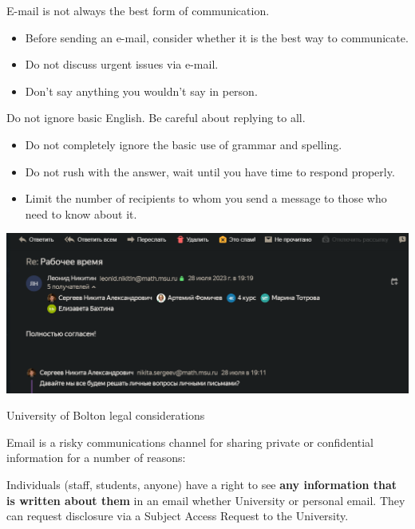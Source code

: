 \documentclass{beamer}
\begin{document}
\begin{frame}{E-mail is not always the best form of communication.}
  \begin{itemize}
    \item Before sending an e-mail, consider whether it is the best way to communicate.
    \item Do not discuss urgent issues via e-mail.
    \item Don't say anything you wouldn't say in person.
  \end{itemize}
\end{frame}

\begin{frame}{Do not ignore basic English. Be careful about replying to all.}
  \begin{itemize}
    \item Do not completely ignore the basic use of grammar and spelling.
    \item Do not rush with the answer, wait until you have time to respond properly.
    \item Limit the number of recipients to whom you send a message to those who need to
          know about it.
  \end{itemize}

  \includegraphics[width=\linewidth]{reply-to-all.png}

\end{frame}

\begin{frame}{University of Bolton \cite{Bolton} legal considerations}
  \begin{displayquote}
    Email is a risky communications channel for sharing private or confidential
    information for a number of reasons:

    Individuals (staff, students, anyone) have a right to see \textbf{any information that is written about them} in
    an email whether University or personal email. They can request disclosure via a Subject Access
    Request to the University.
  \end{displayquote}
\end{frame}
\end{document}
